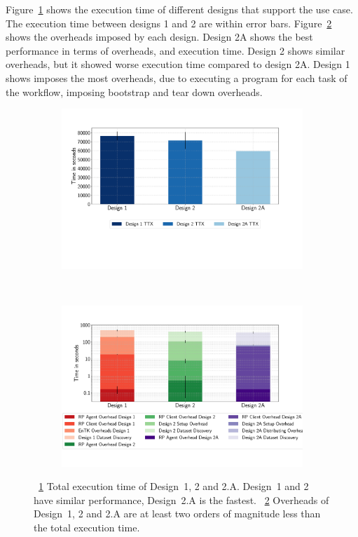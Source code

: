 Figure~\ref{fig:ttx} shows the execution time of different designs that support the use case. 
The execution time between designs 1 and 2 are within error bars.
Figure~\ref{fig:overheads} shows the overheads imposed by each design.
Design 2A shows the best performance in terms of overheads, and execution time.
Design 2 shows similar overheads, but it showed worse execution time compared to design 2A.
Design 1 shows imposes the most overheads, due to executing a program for each task of the workflow, imposing bootstrap and tear down overheads.

\begin{figure}[ht!]
    \centering
    \begin{subfigure}[b]{0.45\textwidth}
        \includegraphics[width=\linewidth]{figures/ttx.pdf}
        \caption{}
        \label{fig:ttx}
    \end{subfigure}%
    ~ 
    \begin{subfigure}[b]{0.45\textwidth}
        \includegraphics[width=\linewidth]{figures/overheads.pdf}
        \caption{}
        \label{fig:overheads}
    \end{subfigure}
    \caption{~\ref{fig:ttx} Total execution time of Design~1, 2 and 2.A. Design~1 and 2 have similar performance, Design~2.A is the fastest. ~\ref{fig:overheads} Overheads of Design~1, 2 and 2.A are at least two orders of magnitude less than the total execution time.}\label{fig:overall_performance}
\end{figure}

